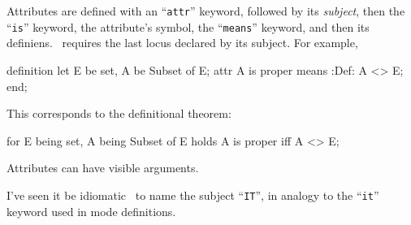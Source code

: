 \begin{node}[Attributes]\label{mizar-000R}%
Attributes are defined with an ``\texttt{attr}'' keyword, followed by
its \emph{subject}, then the ``\texttt{is}'' keyword, the attribute's
symbol, the ``\texttt{means}'' keyword, and then its
definiens. \Mizar\ requires the last locus declared by its subject. For
example,
\begin{mizar}
definition
  let E be set, A be Subset of E;
  attr A is proper means :Def:
  A <> E;
end;
\end{mizar}
This corresponds to the definitional theorem:
\begin{mizar}
for E being set, A being Subset of E holds
A is proper iff A <> E;
\end{mizar}
Attributes can have visible arguments.

\begin{node}[Idiom]\label{mizar-000V}%
I've seen it be idiomatic \Mizar\ to name the subject ``\texttt{IT}'',
in analogy to the ``\texttt{it}'' keyword used in mode definitions.
\end{node}
\end{node}

